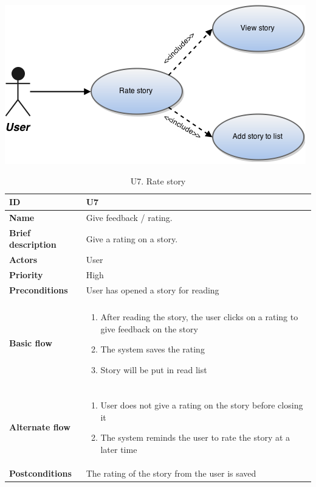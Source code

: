 \begin{table}[htp]
	\includegraphics[width=\textwidth]{fig/U7}
	\centering
	\caption{U7. Rate story}
	\begin{tabular}[b]{|l | l|}\hline
		\textbf{ID} 				& U7									\\\hline
		\textbf{Name} 				& Give feedback / rating.				\\\hline
		\textbf{Brief description}	& Give a rating on a story. 			\\\hline
		\textbf{Actors} 			& User									\\\hline
		\textbf{Priority}			& High									\\\hline
		\textbf{Preconditions}		& User has opened a story for reading	\\\hline&\\[-2ex]
		\textbf{Basic flow}			& \begin{minipage}{5in}
			\begin{enumerate}[noitemsep]
				\item After reading the story,  the user clicks on a rating to give feedback on the story
				\item The system saves the rating
				\item Story will be put in read list
			\end{enumerate}						
		\end{minipage}						\\\hline&\\[-2ex]
		\textbf{Alternate flow}		& \begin{minipage}{5in}
			\begin{enumerate}[noitemsep]
				\item User does not give a rating on the story before closing it
				\item The system reminds the user to rate the story at a later time
			\end{enumerate}
		\end{minipage}							\\\hline
		\textbf{Postconditions}		& The rating of the story from the user is saved\\\hline
	\end{tabular}
\end{table}

